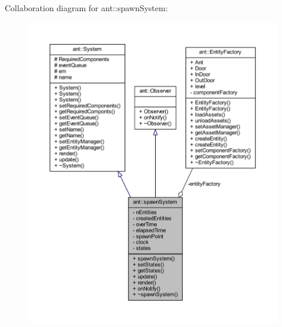 Collaboration diagram for ant\+:\+:spawn\+System\+:
\nopagebreak
\begin{figure}[H]
\begin{center}
\leavevmode
\includegraphics[width=350pt]{d8/d79/classant_1_1spawn_system__coll__graph}
\end{center}
\end{figure}
